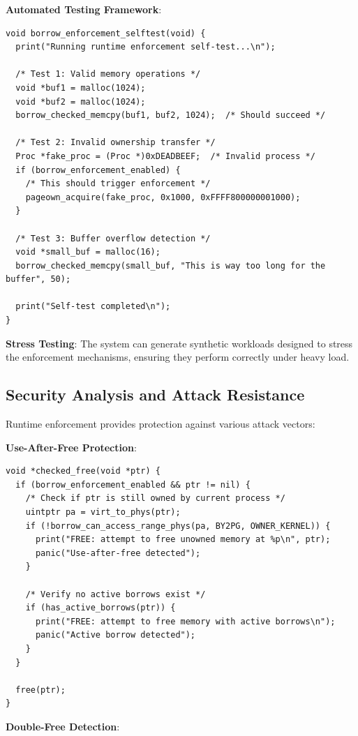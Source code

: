 \documentclass[11pt,letterpaper]{article}
\begin{document}
\textbf{Automated Testing Framework}:

\begin{lstlisting}
void borrow_enforcement_selftest(void) {
  print("Running runtime enforcement self-test...\n");
  
  /* Test 1: Valid memory operations */
  void *buf1 = malloc(1024);
  void *buf2 = malloc(1024);
  borrow_checked_memcpy(buf1, buf2, 1024);  /* Should succeed */
  
  /* Test 2: Invalid ownership transfer */
  Proc *fake_proc = (Proc *)0xDEADBEEF;  /* Invalid process */
  if (borrow_enforcement_enabled) {
    /* This should trigger enforcement */
    pageown_acquire(fake_proc, 0x1000, 0xFFFF800000001000);
  }
  
  /* Test 3: Buffer overflow detection */
  void *small_buf = malloc(16);
  borrow_checked_memcpy(small_buf, "This is way too long for the buffer", 50);
  
  print("Self-test completed\n");
}
\end{lstlisting}

\textbf{Stress Testing}: The system can generate synthetic workloads designed to stress the enforcement mechanisms, ensuring they perform correctly under heavy load.

\subsection{Security Analysis and Attack Resistance}

Runtime enforcement provides protection against various attack vectors:

\textbf{Use-After-Free Protection}:

\begin{lstlisting}
void *checked_free(void *ptr) {
  if (borrow_enforcement_enabled && ptr != nil) {
    /* Check if ptr is still owned by current process */
    uintptr pa = virt_to_phys(ptr);
    if (!borrow_can_access_range_phys(pa, BY2PG, OWNER_KERNEL)) {
      print("FREE: attempt to free unowned memory at %p\n", ptr);
      panic("Use-after-free detected");
    }
    
    /* Verify no active borrows exist */
    if (has_active_borrows(ptr)) {
      print("FREE: attempt to free memory with active borrows\n");
      panic("Active borrow detected");
    }
  }
  
  free(ptr);
}
\end{lstlisting}

\textbf{Double-Free Detection}:
\end{document}
